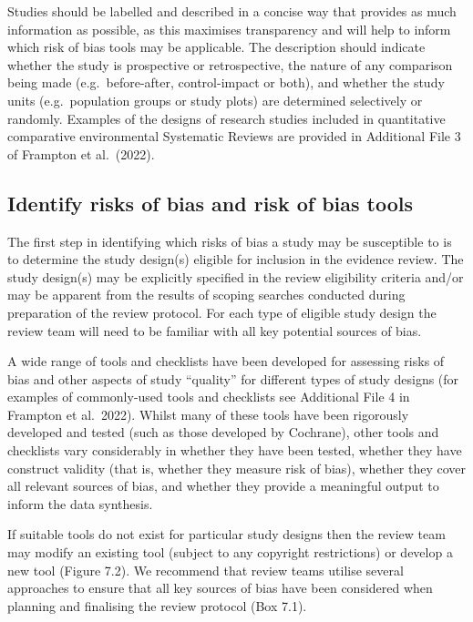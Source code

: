 \documentclass[
  letterpaper,
  DIV=11,
  numbers=noendperiod]{scrreprt}
\begin{document}
Studies should be labelled and described in a concise way that provides
as much information as possible, as this maximises transparency and will
help to inform which risk of bias tools may be applicable. The
description should indicate whether the study is prospective or
retrospective, the nature of any comparison being made
(e.g.~before-after, control-impact or both), and whether the study units
(e.g.~population groups or study plots) are determined selectively or
randomly. Examples of the designs of research studies included in
quantitative comparative environmental Systematic Reviews are provided
in Additional File 3 of Frampton et al.~(2022).

\subsection{Identify risks of bias and risk of bias
tools}\label{identify-risks-of-bias-and-risk-of-bias-tools}

The first step in identifying which risks of bias a study may be
susceptible to is to determine the study design(s) eligible for
inclusion in the evidence review. The study design(s) may be explicitly
specified in the review eligibility criteria and/or may be apparent from
the results of scoping searches conducted during preparation of the
review protocol. For each type of eligible study design the review team
will need to be familiar with all key potential sources of bias.

A wide range of tools and checklists have been developed for assessing
risks of bias and other aspects of study ``quality'' for different types
of study designs (for examples of commonly-used tools and checklists see
Additional File 4 in Frampton et al.~2022). Whilst many of these tools
have been rigorously developed and tested (such as those developed by
Cochrane), other tools and checklists vary considerably in whether they
have been tested, whether they have construct validity (that is, whether
they measure risk of bias), whether they cover all relevant sources of
bias, and whether they provide a meaningful output to inform the data
synthesis.

If suitable tools do not exist for particular study designs then the
review team may modify an existing tool (subject to any copyright
restrictions) or develop a new tool (Figure 7.2). We recommend that
review teams utilise several approaches to ensure that all key sources
of bias have been considered when planning and finalising the review
protocol (Box 7.1).
\end{document}
